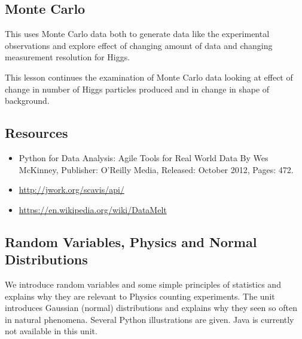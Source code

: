 \subsection{Monte Carlo}

This uses Monte Carlo data both to generate data like the experimental
observations and explore effect of changing amount of data and changing
measurement resolution for Higgs.


This lesson continues the examination of Monte Carlo data looking at
effect of change in number of Higgs particles produced and in change
in shape of background.


\subsection{Resources}

\begin{itemize}

\item
  Python for Data Analysis: Agile Tools for Real World Data By Wes
  McKinney, Publisher: O'Reilly Media, Released: October 2012, Pages:
  472.
\item
  \url{http://jwork.org/scavis/api/}
\item
  \url{https://en.wikipedia.org/wiki/DataMelt}
\end{itemize}

\subsection{Random Variables, Physics and
  Normal Distributions}

We introduce random variables and some simple principles of statistics
and explains why they are relevant to Physics counting experiments. The
unit introduces Gaussian (normal) distributions and explains why they
seen so often in natural phenomena. Several Python illustrations are
given. Java is currently not available in this unit.



